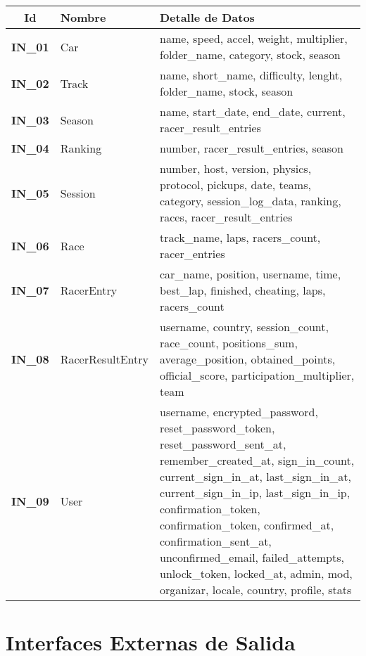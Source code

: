 \begin{center}
	\begin{tabular}{ | c | p{3.5cm} | p{10cm} |}
		\hline
		\textbf{Id} & {\textbf{Nombre}} & {\textbf{Detalle de Datos}} \\ \hline
		{\textbf{IN\_01}} & Car & name, speed, accel, weight, multiplier, folder\_name, category, stock, season \\ \hline
		{\textbf{IN\_02}} & Track &  name, short\_name, difficulty, lenght, folder\_name, stock, season \\ \hline
		{\textbf{IN\_03}} & Season & name, start\_date, end\_date, current, racer\_result\_entries \\ \hline
		{\textbf{IN\_04}} & Ranking & number, racer\_result\_entries, season \\ \hline
		{\textbf{IN\_05}} & Session & number, host, version, physics, protocol, pickups, date, teams, category, session\_log\_data, ranking, races, racer\_result\_entries \\ \hline
		{\textbf{IN\_06}} & Race & track\_name, laps, racers\_count, racer\_entries \\ \hline
		{\textbf{IN\_07}} & RacerEntry & car\_name, position, username, time, best\_lap, finished, cheating, laps, racers\_count\\ \hline
		{\textbf{IN\_08}} & RacerResultEntry & username, country, session\_count, race\_count, positions\_sum, average\_position, obtained\_points, official\_score, participation\_multiplier, team \\ \hline
		{\textbf{IN\_09}} & User & username, encrypted\_password, reset\_password\_token, reset\_password\_sent\_at, remember\_created\_at, sign\_in\_count, current\_sign\_in\_at, last\_sign\_in\_at, current\_sign\_in\_ip, last\_sign\_in\_ip, confirmation\_token, confirmation\_token, confirmed\_at, confirmation\_sent\_at, unconfirmed\_email, failed\_attempts, unlock\_token, locked\_at, admin, mod, organizar, locale, country, profile, stats \\ \hline
	\end{tabular}
\end{center}

\newpage

\section{Interfaces Externas de Salida}

